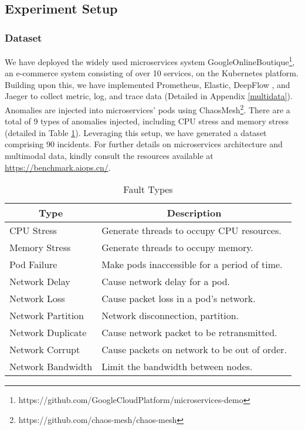 



\subsection{Experiment Setup}

\subsubsection{Dataset}
We have deployed the widely used microservices system GoogleOnlineBoutique\footnote{https://github.com/GoogleCloudPlatform/microservices-demo}, an e-commerce system consisting of over 10 services, on the Kubernetes platform. Building upon this, we have implemented Prometheus, Elastic, DeepFlow \cite{deepflow}, and Jaeger to collect metric, log, and trace data (Detailed in Appendix \ref{multidata}). Anomalies are injected into microservices' pods using ChaosMesh\footnote{https://github.com/chaos-mesh/chaos-mesh}. There are a total of 9 types of anomalies injected, including CPU stress and memory stress (detailed in Table \ref{tab:faulttype}). Leveraging this setup, we have generated a dataset comprising 90 incidents. For further details on microservices architecture and multimodal data, kindly consult the resources available at \url{https://benchmark.aiops.cn/}.


\begin{table}[H]
\centering
\caption{Fault Types}
\label{tab:faulttype}
\small
\begin{tabular}{ll} 
\toprule
\multicolumn{1}{c}{Type} & \multicolumn{1}{c}{Description}                        \\ 
\midrule
CPU Stress               & Generate threads to occupy CPU resources.         \\
Memory Stress            & Generate threads to occupy memory.                \\
Pod Failure              & Make pods inaccessible for a period of time.        \\
Network Delay            & Cause network delay for a pod.                        \\
Network Loss             & Cause packet loss in a pod's network.                 \\
Network Partition        & Network disconnection, partition.                      \\
Network Duplicate        & Cause network packet to be retransmitted.     \\
Network Corrupt          & Cause packets on network to be out of order.  \\
Network Bandwidth        & Limit the bandwidth between nodes.    \\
\bottomrule
\end{tabular}
\end{table}


